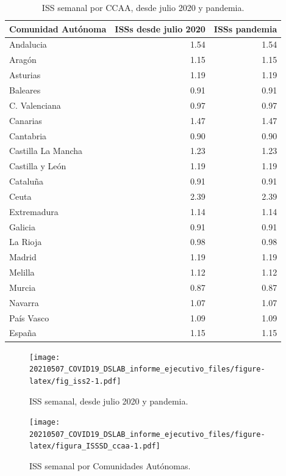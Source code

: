 \documentclass[
  11pt,
]{article}
\begin{document}
\begin{table}[!h]

\caption{\label{tab:tabla2}ISS semanal por CCAA, desde julio 2020 y pandemia.}
\centering
\fontsize{9}{11}\selectfont
\begin{tabular}[t]{l|r|r}
\hline
Comunidad Autónoma & ISSs desde julio 2020 & ISSs pandemia\\
\hline
Andalucia & 1.54 & 1.54\\
\hline
Aragón & 1.15 & 1.15\\
\hline
Asturias & 1.19 & 1.19\\
\hline
Baleares & 0.91 & 0.91\\
\hline
C. Valenciana & 0.97 & 0.97\\
\hline
Canarias & 1.47 & 1.47\\
\hline
Cantabria & 0.90 & 0.90\\
\hline
Castilla La Mancha & 1.23 & 1.23\\
\hline
Castilla y León & 1.19 & 1.19\\
\hline
Cataluña & 0.91 & 0.91\\
\hline
Ceuta & 2.39 & 2.39\\
\hline
Extremadura & 1.14 & 1.14\\
\hline
Galicia & 0.91 & 0.91\\
\hline
La Rioja & 0.98 & 0.98\\
\hline
Madrid & 1.19 & 1.19\\
\hline
Melilla & 1.12 & 1.12\\
\hline
Murcia & 0.87 & 0.87\\
\hline
Navarra & 1.07 & 1.07\\
\hline
País Vasco & 1.09 & 1.09\\
\hline
España & 1.15 & 1.15\\
\hline
\end{tabular}
\end{table}

\begin{figure}
\centering
\texttt{[image: 20210507\_COVID19\_DSLAB\_informe\_ejecutivo\_files/figure-latex/fig\_iss2-1.pdf]}
\caption{\label{fig:fig_iss2} ISS semanal, desde julio 2020 y pandemia.}
\end{figure}

\begin{figure}
\centering
\texttt{[image: 20210507\_COVID19\_DSLAB\_informe\_ejecutivo\_files/figure-latex/figura\_ISSSD\_ccaa-1.pdf]}
\caption{\label{fig:figura_ISSSD_ccaa} ISS semanal por Comunidades
Autónomas.}
\end{figure}
\end{document}
